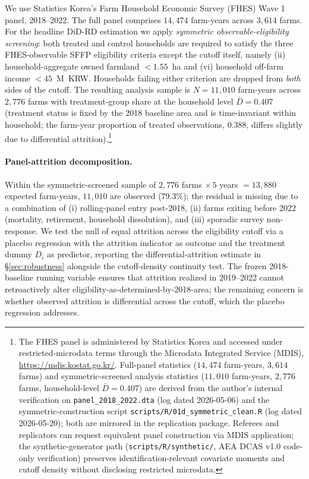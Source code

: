 \documentclass[12pt, a4paper]{article}
\begin{document}
We use Statistics Korea's Farm Household Economic Survey (FHES) Wave 1 panel, 2018--2022. The full panel comprises $14{,}474$ farm-years across $3{,}614$ farms. For the headline DiD-RD estimation we apply \emph{symmetric observable-eligibility screening}: both treated and control households are required to satisfy the three FHES-observable SFFP eligibility criteria except the cutoff itself, namely (ii) household-aggregate owned farmland $< 1.55$~ha and (vi) household off-farm income $< 45$~M~KRW. Households failing either criterion are dropped from \emph{both} sides of the cutoff. The resulting analysis sample is $N = 11{,}010$ farm-years across $2{,}776$ farms with treatment-group share at the household level $\bar D = 0.407$ (treatment status is fixed by the 2018 baseline area and is time-invariant within household; the farm-year proportion of treated observations, $0.388$, differs slightly due to differential attrition).\footnote{The FHES panel is administered by Statistics Korea and accessed under restricted-microdata terms through the Microdata Integrated Service (MDIS), \url{https://mdis.kostat.go.kr/}. Full-panel statistics ($14{,}474$ farm-years, $3{,}614$ farms) and symmetric-screened analysis statistics ($11{,}010$ farm-years, $2{,}776$ farms, household-level $\bar D = 0.407$) are derived from the author's internal verification on \texttt{panel\_2018\_2022.dta} (log dated 2026-05-06) and the symmetric-construction script \texttt{scripts/R/01d\_symmetric\_clean.R} (log dated 2026-05-20); both are mirrored in the replication package. Referees and replicators can request equivalent panel construction via MDIS application; the synthetic-generator path (\texttt{scripts/R/synthetic/}, AEA DCAS v1.0 code-only verification) preserves identification-relevant covariate moments and cutoff density without disclosing restricted microdata.}

\paragraph{Panel-attrition decomposition.} Within the symmetric-screened sample of $2{,}776$ farms $\times\,5$ years $= 13{,}880$ expected farm-years, $11{,}010$ are observed ($79.3\%$); the residual is missing due to a combination of (i) rolling-panel entry post-2018, (ii) farms exiting before 2022 (mortality, retirement, household dissolution), and (iii) sporadic survey non-response. We test the null of equal attrition across the eligibility cutoff via a placebo regression with the attrition indicator as outcome and the treatment dummy $D_i$ as predictor, reporting the differential-attrition estimate in \S\ref{sec:robustness} alongside the \citet{McCrary2008_density} cutoff-density continuity test. The frozen 2018-baseline running variable ensures that attrition realized in 2019--2022 cannot retroactively alter eligibility-as-determined-by-2018-area; the remaining concern is whether observed attrition is differential across the cutoff, which the placebo regression addresses.
\end{document}
